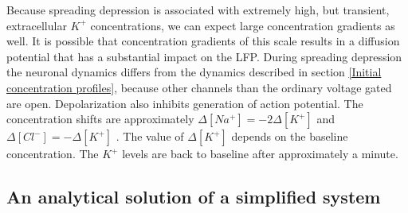 \documentclass{article}
\begin{document}
Because spreading depression is associated with extremely high, but transient, extracellular $K^+$ concentrations, we can expect large concentration gradients as well. It is possible that concentration gradients of this scale results in a diffusion potential that has a substantial impact on the LFP. During spreading depression the neuronal dynamics differs from the dynamics described in section \ref{Initial concentration profiles}, because other channels than the ordinary voltage gated are open. Depolarization also inhibits generation of action potential. The concentration shifts are approximately $\Delta [Na^+] = -2\Delta [K^+]$ and $\Delta [Cl^-] = -\Delta[K^+]$ \cite{Herreras1993} \cite{Ataya2015}. The value of $\Delta [K^+]$ depends on the baseline concentration. The $K^+$ levels are back to baseline after approximately a minute. 

\subsection{An analytical solution of a simplified system}
\end{document}
